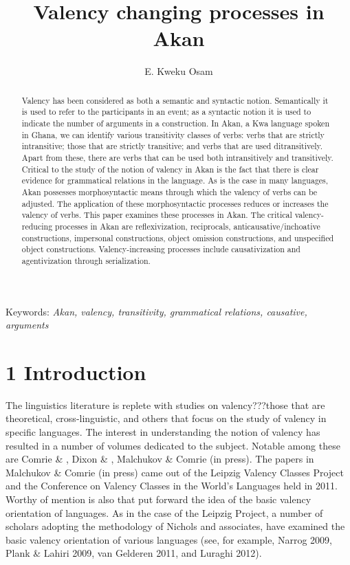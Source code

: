 \documentclass[output=paper]{langsci/langscibook}
\title{Valency changing processes in {Akan} }
\author{%
E. Kweku Osam\affiliation{University of Ghana} 
}
\begin{document}
\begin{abstract}
Valency has been considered as both a semantic and syntactic notion. Semantically it is used to refer to the participants in an event; as a syntactic notion it is used to indicate the number of arguments in a construction. In Akan, a Kwa language spoken in Ghana, we can identify various transitivity classes of verbs: verbs that are strictly intransitive; those that are strictly transitive; and verbs that are used ditransitively. Apart from these, there are verbs that can be used both intransitively and transitively. Critical to the study of the notion of valency in Akan is the fact that there is clear evidence for grammatical relations in the language. As is the case in many languages, Akan possesses morphosyntactic means through which the valency of verbs can be adjusted. The application of these morphosyntactic processes reduces or increases the valency of verbs. This paper examines these processes in Akan. The critical valency-reducing processes in Akan are reflexivization, reciprocals, anticausative/inchoative constructions, impersonal constructions, object omission constructions, and unspecified object constructions. Valency-increasing processes include causativization and agentivization through serialization.
\end{abstract}

Keywords: \emph{Akan, valency, transitivity, grammatical relations, causative, arguments}

\chapter{1 Introduction}
\begin{styleBodyTextIndent}
The linguistics literature is replete with studies on valency???those that are theoretical, cross-linguistic, and others that focus on the study of valency in specific languages. The interest in understanding the notion of valency has resulted in a number of volumes dedicated to the subject. Notable among these are Comrie \& \citet{Polinsky1993}, Dixon \& \citet{Aikhenvald2000a}, Malchukov \& Comrie (in press). The papers in Malchukov \& Comrie (in press) came out of the Leipzig Valency Classes Project and the Conference on Valency Classes in the World's Languages held in 2011. Worthy of mention is also \citet{NicholsEtAl2004} that put forward the idea of the basic valency orientation of languages. As in the case of the Leipzig Project, a number of scholars adopting the methodology of Nichols and associates, have examined the basic valency orientation of various languages (see, for example, Narrog 2009, Plank \& Lahiri 2009, van Gelderen 2011, and Luraghi 2012).  
\end{styleBodyTextIndent}
\end{document}
